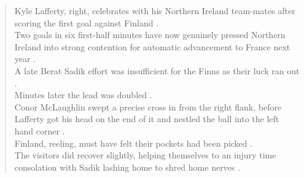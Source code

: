 \documentclass[a4paper, 12pt]{article}
\begin{document}
\begin{quotation}
 Kyle Lafferty,  right,  celebrates with his Northern Ireland team-mates after scoring the first goal against Finland . \\

Two goals in six first-half minutes have now genuinely pressed Northern Ireland into strong contention for automatic advancement to France next year . \\

A late Berat Sadik effort was insufficient for the Finns as their luck ran out . \\

Minutes later the lead was doubled . \\

Conor McLaughlin swept a precise cross in from the right flank,  before Lafferty got his head on the end of it and nestled the ball into the left hand corner . \\

Finland,  reeling,  must have felt their pockets had been picked . \\

The visitors did recover slightly,  helping themselves to an injury time consolation with Sadik lashing home to shred home nerves . \\
\end{quotation}


\newpage
\printindex
\end{document}
